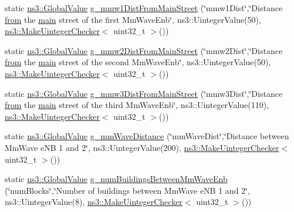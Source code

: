 \begin{DoxyCompactItemize}
\item 
static \hyperlink{classns3_1_1GlobalValue}{ns3\+::\+Global\+Value} \hyperlink{mc-twoenbs_8cc_a69b5f118879ed3e1fdde4d1775c3a056}{g\+\_\+mmw1\+Dist\+From\+Main\+Street} (\char`\"{}mmw1\+Dist\char`\"{},\char`\"{}Distance \hyperlink{lte__amc_8m_a1b4c81ff74eb1a626b5ade44c81004b3}{from} the \hyperlink{wimax-simple_8cc_a0ddf1224851353fc92bfbff6f499fa97}{main} street of the first Mm\+Wave\+Enb\char`\"{}, ns3\+::\+Uinteger\+Value(50), \hyperlink{namespacens3_aed274764da411ed9397a3524a7c9abb8}{ns3\+::\+Make\+Uinteger\+Checker}$<$ uint32\+\_\+t $>$())
\item 
static \hyperlink{classns3_1_1GlobalValue}{ns3\+::\+Global\+Value} \hyperlink{mc-twoenbs_8cc_a55e05eacdfb95abe95fbcc91e8c21443}{g\+\_\+mmw2\+Dist\+From\+Main\+Street} (\char`\"{}mmw2\+Dist\char`\"{},\char`\"{}Distance \hyperlink{lte__amc_8m_a1b4c81ff74eb1a626b5ade44c81004b3}{from} the \hyperlink{wimax-simple_8cc_a0ddf1224851353fc92bfbff6f499fa97}{main} street of the second Mm\+Wave\+Enb\char`\"{}, ns3\+::\+Uinteger\+Value(50), \hyperlink{namespacens3_aed274764da411ed9397a3524a7c9abb8}{ns3\+::\+Make\+Uinteger\+Checker}$<$ uint32\+\_\+t $>$())
\item 
static \hyperlink{classns3_1_1GlobalValue}{ns3\+::\+Global\+Value} \hyperlink{mc-twoenbs_8cc_a57e450db8750b692f410266a45ba6b03}{g\+\_\+mmw3\+Dist\+From\+Main\+Street} (\char`\"{}mmw3\+Dist\char`\"{},\char`\"{}Distance \hyperlink{lte__amc_8m_a1b4c81ff74eb1a626b5ade44c81004b3}{from} the \hyperlink{wimax-simple_8cc_a0ddf1224851353fc92bfbff6f499fa97}{main} street of the third Mm\+Wave\+Enb\char`\"{}, ns3\+::\+Uinteger\+Value(110), \hyperlink{namespacens3_aed274764da411ed9397a3524a7c9abb8}{ns3\+::\+Make\+Uinteger\+Checker}$<$ uint32\+\_\+t $>$())
\item 
static \hyperlink{classns3_1_1GlobalValue}{ns3\+::\+Global\+Value} \hyperlink{mc-twoenbs_8cc_aa09a9312753e1b81f60df6c1886f595f}{g\+\_\+mm\+Wave\+Distance} (\char`\"{}mm\+Wave\+Dist\char`\"{},\char`\"{}Distance between Mm\+Wave e\+NB 1 and 2\char`\"{}, ns3\+::\+Uinteger\+Value(200), \hyperlink{namespacens3_aed274764da411ed9397a3524a7c9abb8}{ns3\+::\+Make\+Uinteger\+Checker}$<$ uint32\+\_\+t $>$())
\item 
static \hyperlink{classns3_1_1GlobalValue}{ns3\+::\+Global\+Value} \hyperlink{mc-twoenbs_8cc_a7fe4f592490bff971c7398fd433b5fad}{g\+\_\+num\+Buildings\+Between\+Mm\+Wave\+Enb} (\char`\"{}num\+Blocks\char`\"{},\char`\"{}Number of buildings between Mm\+Wave e\+NB 1 and 2\char`\"{}, ns3\+::\+Uinteger\+Value(8), \hyperlink{namespacens3_aed274764da411ed9397a3524a7c9abb8}{ns3\+::\+Make\+Uinteger\+Checker}$<$ uint32\+\_\+t $>$())

\end{DoxyCompactItemize}
